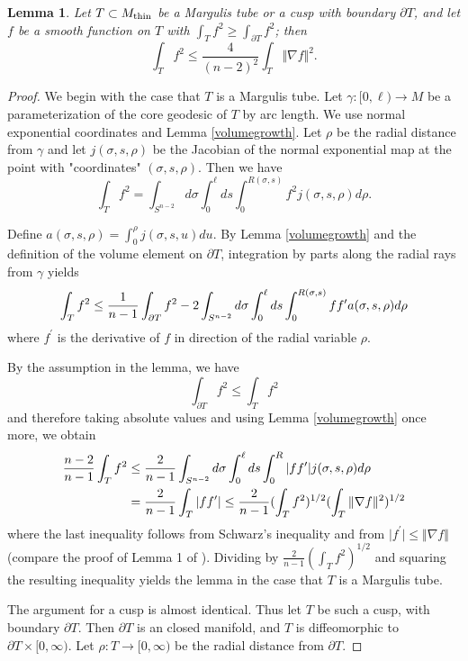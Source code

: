 \documentclass[11pt]{amsart}
\theoremstyle{plain}
\theoremstyle{plain}
\newtheorem{lemma}[theorem]{Lemma}
\theoremstyle{definition}
\begin{document}
\begin{lemma}\label{partialintegration}
Let $T\subset M_{\rm thin}$ be a Margulis tube or a cusp with boundary 
$\partial T$, and 
let $f$ be a smooth function
on $T$ with $\int_T f^2\geq \int_{\partial T}f^2$; then 
\[\int_T f^2\leq \frac{4}{(n-2)^2}\int_T \Vert \nabla f \Vert^2.\]
\end{lemma}
\begin{proof} We begin with the case that $T$ is a Margulis tube. 
Let $\gamma:[0,\ell)\to M$ be a parameterization of the core geodesic 
of $T$ by arc length. We use normal exponential coordinates and Lemma \ref{volumegrowth}.
Let $\rho$ be the radial distance from $\gamma$ and let 
$j(\sigma,s,\rho)$ be the Jacobian of the normal exponential map 
at the point with
"coordinates" $(\sigma,s,\rho)$. 
Then we have 
\[\int_Tf^2=\int_{S^{n-2}}d\sigma\int_0^\ell ds
\int_0^{R(\sigma,s)} f^2 j(\sigma,s,\rho) d\rho.\]


Define $a(\sigma,s,\rho)=\int_0^{\rho}j(\sigma,s,u)du$. 
By Lemma \ref{volumegrowth} 
and the definition of the volume element on $\partial T$, 
integration by parts along the radial rays from $\gamma$ 
yields 
\begin{equation}\label{inequality1}
\int_T f^2\leq \frac{1}{n-1}
\int_{\partial T} f^2 - 
2\int_{S^{n-2}}d\sigma\int_0^\ell ds \int_0^{R(\sigma,s)} ff^\prime 
a(\sigma,s,\rho) d\rho\notag \end{equation}
where $f^\prime$ is the derivative of $f$ in direction of the 
radial variable $\rho$.

 
By the assumption in the lemma, 
we have 
\[\int_{\partial T} f^2 \leq \int_Tf^2\]
and therefore taking absolute values 
and using Lemma \ref{volumegrowth} once more, 
we obtain
\begin{align}
\frac{n-2}{n-1}\int_T f^2  & \leq  
\frac{2}{n-1}
\int_{S^{n-2}}d\sigma\int_0^\ell ds \int_0^R \vert  ff^\prime \vert j(\sigma,s,\rho) d\rho
\notag\\ & =
\frac{2}{n-1}\int_T \vert  ff^\prime \vert 
\leq \frac{2}{n-1}
(\int_T f^2)^{1/2}(\int_T \Vert \nabla f\Vert^2)^{1/2} \notag\end{align}
where the last inequality follows from 
Schwarz's inequality and from $\vert f^\prime\vert \leq 
\Vert \nabla f\Vert$ (compare the proof of  
Lemma 1 of \cite{DR86}). Dividing by 
$\frac{2}{n-1}(\int_T f^2)^{1/2}$ and 
squaring the resulting inequality yields the lemma in the case that
$T$ is a Margulis tube.

The argument for a cusp is almost identical.
Thus let $T$ be such a cusp, with boundary $\partial T$. 
Then $\partial T$ is an closed manifold, 
and $T$ is diffeomorphic to $\partial T\times [0,\infty)$.
Let $\rho:T\to [0,\infty)$ be the radial distance from $\partial T$. 
 


\end{proof}
\end{document}
